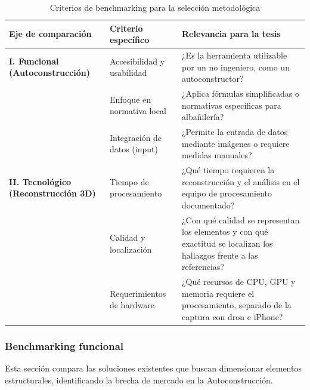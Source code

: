 \documentclass[12pt,oneside]{report}
\begin{document}
\begin{table}[htbp]
  \centering
  \caption{Criterios de benchmarking para la selección metodológica}
  \label{tab:criterios-benchmarking}
  \small
  \setlength{\tabcolsep}{4pt}
  \renewcommand{\arraystretch}{1.2}
  \begin{tabular}{>{\raggedright\arraybackslash}p{} >{\raggedright\arraybackslash}p{} >{\raggedright\arraybackslash}p{}}
    \toprule
    \textbf{Eje de comparación} & \textbf{Criterio específico} & \textbf{Relevancia para la tesis} \\
    \midrule
    \textbf{I. Funcional (Autoconstrucción)} & Accesibilidad y usabilidad & ¿Es la herramienta utilizable por un no ingeniero, como un autoconstructor? \\
    & Enfoque en normativa local & ¿Aplica fórmulas simplificadas o normativas específicas para albañilería? \\
    & Integración de datos (input) & ¿Permite la entrada de datos mediante imágenes o requiere medidas manuales? \\
    \midrule
    \textbf{II. Tecnológico (Reconstrucción 3D)} & Tiempo de procesamiento & ¿Qué tiempo requieren la reconstrucción y el análisis en el equipo de procesamiento documentado? \\
    & Calidad y localización & ¿Con qué calidad se representan los elementos y con qué exactitud se localizan los hallazgos frente a las referencias? \\
    & Requerimientos de hardware & ¿Qué recursos de CPU, GPU y memoria requiere el procesamiento, separado de la captura con dron e iPhone? \\
    \bottomrule
  \end{tabular}
\end{table}

\subsubsection{Benchmarking funcional}

Esta sección compara las soluciones existentes que buscan dimensionar elementos estructurales, identificando la brecha de mercado en la Autoconstrucción.\par
\end{document}
